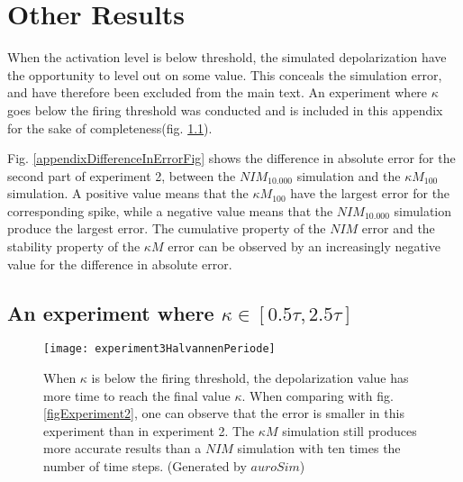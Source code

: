 




\chapter{Other Results}
	When the activation level is below threshold, the simulated depolarization have the opportunity to level out on some value.
	This conceals the simulation error, and have therefore been excluded from the main text.
	An experiment where $\kappa$ goes below the firing threshold was conducted and is included in this appendix for the sake of completeness(fig. \ref{appendixExperiment3Fig}).

	Fig. \ref{appendixDifferenceInErrorFig} shows the difference in absolute error for the second part of experiment 2, between the $NIM_{10.000}$ simulation and the $\kappa M_{100}$ simulation.
	A positive value means that the $\kappa M_{100}$ have the largest error for the corresponding spike, while a negative value means that the $NIM_{10.000}$ simulation produce the largest error.
	The cumulative property of the $NIM$ error and the stability property of the $\kappa M$ error can be observed by an increasingly negative value for the difference in absolute error.
		

\newpage
	\section{An experiment where $\kappa \in [0.5\tau, 2.5\tau]$}
		\label{appendixExperiment3Sec}

		\begin{figure}[hbt!p]
			\centerline{ \texttt{[image: experiment3HalvannenPeriode]} }
 			\caption[Experiment 3, where $\kappa$ varies between $0.5\tau$ and $2.5\tau$.]{
				When $\kappa$ is below the firing threshold, the depolarization value has more time to reach the final value $\kappa$.
				When comparing with fig. \ref{figExperiment2}, one can observe that the error is smaller in this experiment than in experiment 2. %
				The $\kappa M$ simulation still produces more accurate results than a $NIM$ simulation with ten times the number of time steps.
				(Generated by $auroSim$)
			}
			\label{appendixExperiment3Fig}
		\end{figure}

